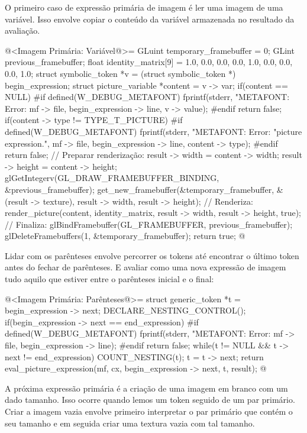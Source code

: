 {{{{{{O primeiro caso de expressão primária de imagem é ler uma imagem de
uma variável. Isso envolve copiar o conteúdo da variável armazenada no
resultado da avaliação.

\iniciocodigo
@<Imagem Primária: Variável@>=
GLuint temporary_framebuffer = 0;
GLint previous_framebuffer;
float identity_matrix[9] = {1.0, 0.0, 0.0,
                             0.0, 1.0, 0.0,
                             0.0, 0.0, 1.0};
struct symbolic_token *v = (struct symbolic_token *) begin_expression;
struct picture_variable *content = v -> var;
if(content == NULL){
#if defined(W_DEBUG_METAFONT)
  fprintf(stderr, "METAFONT: Error: %
          mf -> file, begin_expression -> line, v -> value);
#endif
  return false;
}
if(content -> type != TYPE_T_PICTURE){
#if defined(W_DEBUG_METAFONT)
  fprintf(stderr, "METAFONT: Error: %
                  "picture expression.\n",
          mf -> file, begin_expression -> line, content -> type);
#endif
  return false;
}
// Preparar renderização:
result -> width = content -> width;
result -> height = content -> height;
glGetIntegerv(GL_DRAW_FRAMEBUFFER_BINDING, &previous_framebuffer);
get_new_framebuffer(&temporary_framebuffer, &(result -> texture),
                    result -> width, result -> height);
// Renderiza:
render_picture(content, identity_matrix, result -> width, result -> height, true);
// Finaliza:
glBindFramebuffer(GL_FRAMEBUFFER, previous_framebuffer);
glDeleteFramebuffers(1, &temporary_framebuffer);
return true;
@
\fimcodigo

Lidar com os parênteses envolve percorrer os tokens até encontrar o
último token antes do fechar de parênteses. E avaliar como uma nova
expressão de imagem tudo aquilo que estiver entre o parênteses inicial
e o final:

\iniciocodigo
@<Imagem Primária: Parênteses@>=
struct generic_token *t = begin_expression -> next;
DECLARE_NESTING_CONTROL();
if(begin_expression -> next == end_expression){
#if defined(W_DEBUG_METAFONT)
  fprintf(stderr, "METAFONT: Error: %
          mf -> file, begin_expression -> line);
#endif
  return false;
}
while(t != NULL && t -> next != end_expression){
  COUNT_NESTING(t);
  t = t -> next;
}
return eval_picture_expression(mf, cx, begin_expression -> next, t, result);
@
\fimcodigo

A próxima expressão primária é a criação de uma imagem em branco com
um dado tamanho. Isso ocorre quando lemos um
token  seguido de um par primário. Criar a
imagem vazia envolve primeiro interpretar o par primário que contém o
seu tamanho e em seguida criar uma textura vazia com tal tamanho.

}}}}}}
